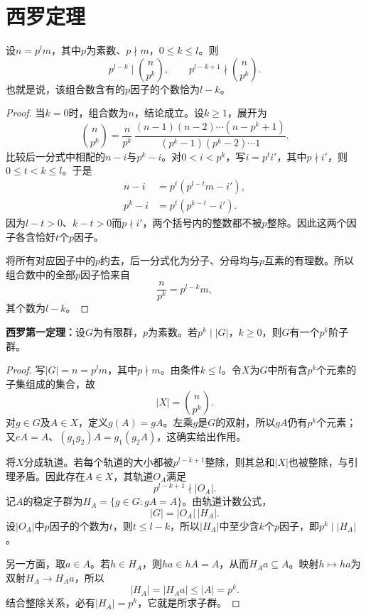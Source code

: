 \section{西罗定理}



\begin{lemma}
设$n=p^lm$，其中$p$为素数、$p\nmid m$，$0\leq k\leq l$。则
\[
p^{l-k}\mid\binom n{p^k},\qquad
p^{l-k+1}\nmid\binom n{p^k}.
\]
也就是说，该组合数含有的$p$因子的个数恰为$l-k$。
\end{lemma}
\begin{proof}
当$k=0$时，组合数为$n$，结论成立。设$k\geq1$，展开为
\[
\binom n{p^k}
=\frac{n}{p^k}\,
\frac{(n-1)(n-2)\cdots(n-p^k+1)}{(p^k-1)(p^k-2)\cdots1}.
\]
比较后一分式中相配的$n-i$与$p^k-i$。对$0<i<p^k$，写$i=p^ti'$，其中$p\nmid i'$，则$0\leq t<k\leq l$。于是
\begin{align*}
n-i&=p^t(p^{l-t}m-i'),\\
p^k-i&=p^t(p^{k-t}-i').
\end{align*}
因为$l-t>0$、$k-t>0$而$p\nmid i'$，两个括号内的整数都不被$p$整除。因此这两个因子各含恰好$t$个$p$因子。

将所有对应因子中的$p$约去，后一分式化为分子、分母均与$p$互素的有理数。所以组合数中的全部$p$因子恰来自
\[
\frac n{p^k}=p^{l-k}m,
\]
其个数为$l-k$。
\end{proof}

\begin{theorem}\label{p2:sylow-one}
\textbf{西罗第一定理：}设$G$为有限群，$p$为素数。若$p^k\mid|G|$，$k\geq0$，则$G$有一个$p^k$阶子群。
\end{theorem}
\begin{proof}
写$|G|=n=p^lm$，其中$p\nmid m$。由条件$k\leq l$。令$X$为$G$中所有含$p^k$个元素的子集组成的集合，故
\[
|X|=\binom n{p^k}.
\]
对$g\in G$及$A\in X$，定义$g(A)=gA$。左乘$g$是$G$的双射，所以$gA$仍有$p^k$个元素；又$eA=A$、$(g_1g_2)A=g_1(g_2A)$，这确实给出作用。

将$X$分成轨道。若每个轨道的大小都被$p^{l-k+1}$整除，则其总和$|X|$也被整除，与引理矛盾。因此存在$A\in X$，其轨道$O_A$满足
\[
p^{l-k+1}\nmid|O_A|.
\]
记$A$的稳定子群为$H_A=\{g\in G:gA=A\}$。由轨道计数公式，
\[
|G|=|O_A|\,|H_A|.
\]
设$|O_A|$中$p$因子的个数为$t$，则$t\leq l-k$，所以$|H_A|$中至少含$k$个$p$因子，即$p^k\mid|H_A|$。

另一方面，取$a\in A$。若$h\in H_A$，则$ha\in hA=A$，从而$H_Aa\subseteq A$。映射$h\mapsto ha$为双射$H_A\to H_Aa$，所以
\[
|H_A|=|H_Aa|\leq|A|=p^k.
\]
结合整除关系，必有$|H_A|=p^k$，它就是所求子群。
\end{proof}

